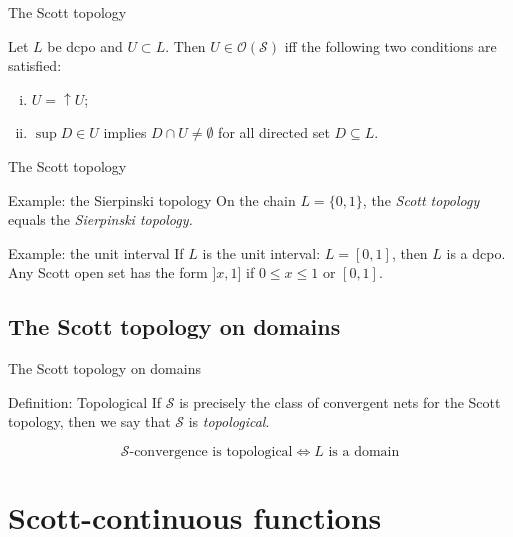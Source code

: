 \documentclass{beamer}
\begin{document}
\begin{frame}{The Scott topology}
\begin{theorem}\label{scottprot} Let $L$ be dcpo and $U \subset L$. Then $U \in \mathcal{O}(\mathcal{S})$ iff the following two conditions are satisfied:
\begin{enumerate}[(i)]
    \item $U = \uparrow U$;
    \item $\sup D \in U$ implies $D \cap U \neq \emptyset$ for all directed set $D \subseteq L$.
\end{enumerate}
\end{theorem}

\end{frame}
\begin{frame}{The Scott topology}
\begin{block}{Example: the Sierpinski topology}
On the chain $L = \{0, 1\}$, the \emph{Scott topology} equals the \emph{Sierpinski topology.}
\end{block}
\begin{block}{Example: the unit interval}
If $L$ is the unit interval: $L = [0,1]$, then $L$ is a dcpo.  Any Scott open set has the form $]x,1]$ if $0 \leq x \leq 1$ or $[0, 1]$.
\end{block}
\end{frame}
\subsection{The Scott topology on domains}
\begin{frame}{The Scott topology on domains}
\begin{block}{Definition: Topological}
If $\mathcal{S}$ is precisely the class of convergent nets for the Scott topology, then we say that $\mathcal{S}$ is \emph{topological}.
\end{block}

\begin{theorem}
$$\mathcal{S}\text{-convergence is topological} \Leftrightarrow L \text{ is a domain}$$
\end{theorem}
\end{frame}

\section{Scott-continuous functions}
\end{document}
